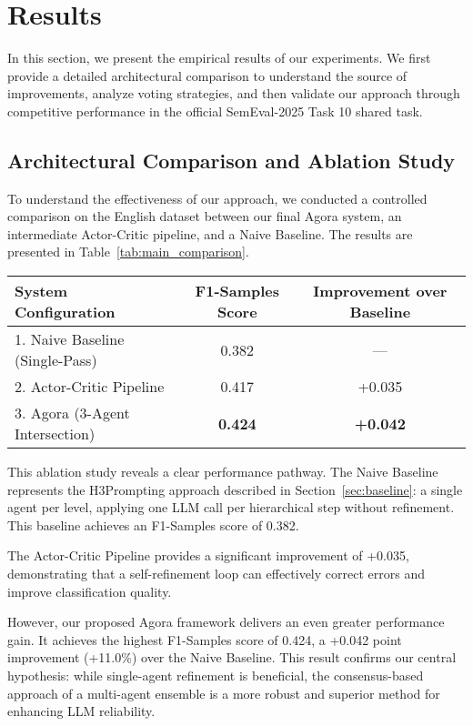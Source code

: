 \section{Results}

In this section, we present the empirical results of our experiments. We first provide a detailed architectural comparison to understand the source of improvements, analyze voting strategies, and then validate our approach through competitive performance in the official SemEval-2025 Task 10 shared task.

\subsection{Architectural Comparison and Ablation Study}

To understand the effectiveness of our approach, we conducted a controlled comparison on the English dataset between our final Agora system, an intermediate Actor-Critic pipeline, and a Naive Baseline. The results are presented in Table~\ref{tab:main_comparison}.

\begin{table*}[ht]
\centering
\caption{Main Performance Comparison on the English Dataset (F1-Samples).}
\label{tab:main_comparison}
\begin{tabular}{lcc}
\hline
\textbf{System Configuration} & \textbf{F1-Samples Score} & \textbf{Improvement over Baseline} \\
\hline
1. Naive Baseline (Single-Pass) & 0.382 & --- \\
2. Actor-Critic Pipeline & 0.417 & +0.035 \\
3. Agora (3-Agent Intersection) & \textbf{0.424} & \textbf{+0.042} \\
\hline
\end{tabular}
\end{table*}

This ablation study reveals a clear performance pathway. The Naive Baseline represents the H3Prompting approach described in Section~\ref{sec:baseline}: a single agent per level, applying one LLM call per hierarchical step without refinement. This baseline achieves an F1-Samples score of 0.382.

The Actor-Critic Pipeline provides a significant improvement of +0.035, demonstrating that a self-refinement loop can effectively correct errors and improve classification quality.

However, our proposed Agora framework delivers an even greater performance gain. It achieves the highest F1-Samples score of 0.424, a +0.042 point improvement (+11.0\%) over the Naive Baseline. This result confirms our central hypothesis: while single-agent refinement is beneficial, the consensus-based approach of a multi-agent ensemble is a more robust and superior method for enhancing LLM reliability.

